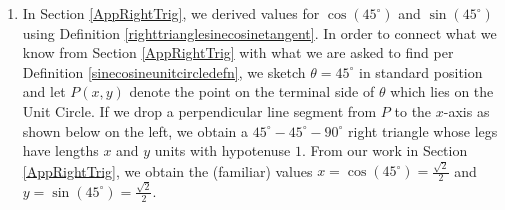 \documentclass{ximera}
\begin{document}
\begin{example}
\begin{explanation}
\begin{enumerate}
\begin{image}

\end{image}

\item  In  Section \ref{AppRightTrig}, we derived values for $\cos\left(45^{\circ}\right)$ and $\sin\left(45^{\circ}\right)$ using  Definition \ref{righttrianglesinecosinetangent}.  In order to connect what we know from   Section \ref{AppRightTrig} with what we are asked to find per  Definition \ref{sinecosineunitcircledefn}, we sketch $\theta = 45^{\circ}$ in standard position and let $P(x,y)$ denote the point on the terminal side of $\theta$ which lies on the Unit Circle.  If we drop a perpendicular line segment from $P$ to the $x$-axis as shown below on the left,  we obtain a $45^{\circ} - 45^{\circ} - 90^{\circ}$ right triangle whose legs have lengths $x$ and $y$ units with hypotenuse $1$. From our work in Section \ref{AppRightTrig}, we obtain the (familiar) values $x = \cos\left(45^{\circ}\right) = \frac{\sqrt{2}}{2}$ and $y = \sin\left(45^{\circ}\right) = \frac{\sqrt{2}}{2}$.

\begin{image}
\end{image}
\end{enumerate}
\end{explanation}
\end{example}
\end{document}
